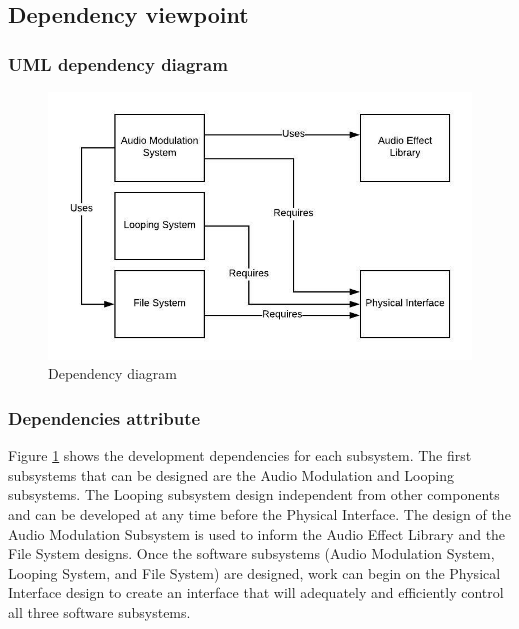 \subsection{Dependency viewpoint}

    \subsubsection{UML dependency diagram}
        \begin{figure}[!ht]
            \centering
            \includegraphics{diagrams/dependency-diagram.jpeg}
            \caption{Dependency diagram}
            \label{fig:dependency}
        \end{figure}
    \subsubsection{Dependencies attribute}
       Figure \ref{fig:dependency} shows the development dependencies for each subsystem. The first subsystems that can be designed are the Audio Modulation and Looping subsystems. The Looping subsystem design independent from other components and can be developed at any time before the Physical Interface. The design of the Audio Modulation Subsystem is used to inform the Audio Effect Library and the File System designs. Once the software subsystems (Audio Modulation System, Looping System, and File System) are designed, work can begin on the Physical Interface design to create an interface that will adequately and efficiently control all three software subsystems.
        